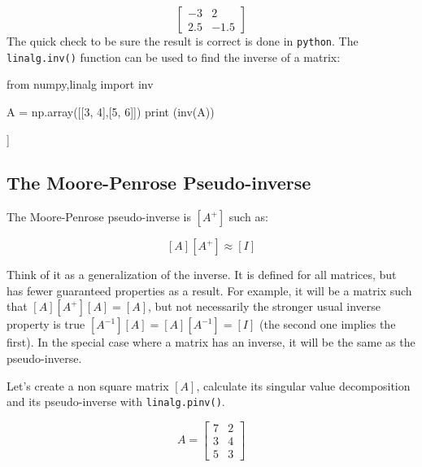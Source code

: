 \[
\begin{bmatrix}
−3 & 2\\
2.5 & −1.5
\end{bmatrix}
\]
The quick check to be sure the result is correct is done in \texttt{python}. The \texttt{linalg.inv()} function can be used to find the inverse of a matrix:

\begin{ipython}
from numpy,linalg import inv

A = np.array([[3, 4],[5, 6]])	
print (inv(A))
\end{ipython}
\begin{ioutput}
[[-3.   2. ]
 [ 2.5 -1.5]]
\end{ioutput}

\subsection{The Moore-Penrose Pseudo-inverse}
\label{the-moore-penrose-pseudoinverse}

The Moore-Penrose pseudo-inverse is \([A^+]\) such as:

\[[A][A^+]≈[I]\]

Think of it as a generalization of the inverse. It is defined for all matrices, but has fewer guaranteed properties as a result. For example, it will be a matrix such that \([𝐴][𝐴^+][𝐴]=[𝐴]\), but not necessarily the stronger usual inverse property is true \([𝐴^{−1}][𝐴]=[𝐴][𝐴^{−1}]=[𝐼]\) (the second one implies the first). In the special case where a matrix has an inverse, it will be the same as the pseudo-inverse.



Let's create a non square matrix $[A]$, calculate its singular value decomposition and its pseudo-inverse with  \texttt{linalg.pinv()}.

\[A=\begin{bmatrix}
7&2\\
3&4\\
5&3\end{bmatrix}\]

